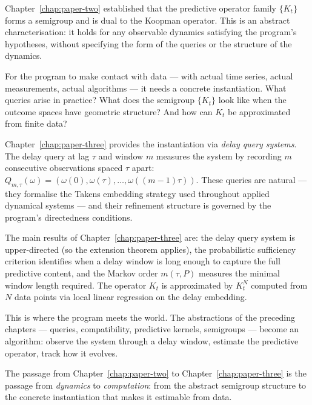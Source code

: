 
Chapter~\ref{chap:paper-two} established that the predictive
operator family $\{K_t\}$ forms a semigroup and is dual to the
Koopman operator.  This is an abstract characterisation: it holds for
any observable dynamics satisfying the program's hypotheses, without
specifying the form of the queries or the structure of the dynamics.

For the program to make contact with data --- with actual time series,
actual measurements, actual algorithms --- it needs a concrete
instantiation.  What queries arise in practice?  What does the
semigroup $\{K_t\}$ look like when the outcome spaces have geometric
structure?  And how can $K_t$ be approximated from finite data?

\medskip

Chapter~\ref{chap:paper-three} provides the instantiation via
\emph{delay query systems}.  The delay query at lag $\tau$ and
window $m$ measures the system by recording $m$ consecutive
observations spaced $\tau$ apart: $Q_{m,\tau}(\omega) =
(\omega(0), \omega(\tau), \ldots, \omega((m-1)\tau))$.  These
queries are natural --- they formalise the Takens embedding strategy
used throughout applied dynamical systems --- and their refinement
structure is governed by the program's directedness conditions.

The main results of Chapter~\ref{chap:paper-three} are:
the delay query system is upper-directed (so the extension theorem
applies), the probabilistic sufficiency criterion identifies when a
delay window is long enough to capture the full predictive content,
and the Markov order $m(\tau, P)$ measures the minimal window length
required.  The operator $K_t$ is approximated by $K_t^N$ computed
from $N$ data points via local linear regression on the delay
embedding.

\medskip

This is where the program meets the world.  The abstractions of the
preceding chapters --- queries, compatibility, predictive kernels,
semigroups --- become an algorithm: observe the system through a delay
window, estimate the predictive operator, track how it evolves.

The passage from Chapter~\ref{chap:paper-two} to
Chapter~\ref{chap:paper-three} is the passage from \emph{dynamics} to
\emph{computation}: from the abstract semigroup structure to the
concrete instantiation that makes it estimable from data.
